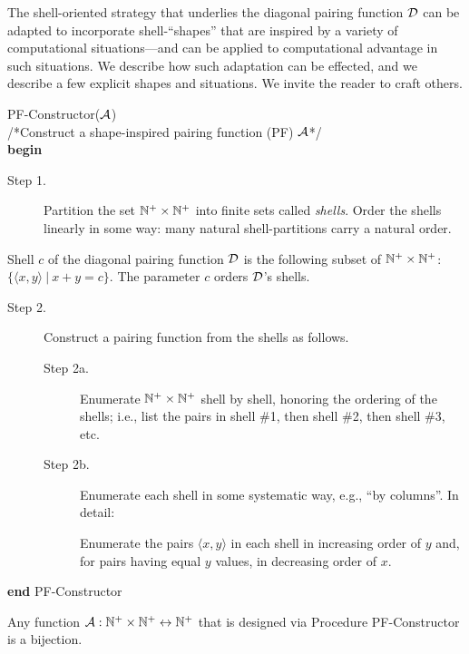 
The shell-oriented strategy that underlies the diagonal pairing function $\mbox{$\cal D$}$ can be adapted to incorporate shell-``shapes'' that are inspired by a variety of computational situations---and can be applied to computational advantage in such situations.  We describe how such adaptation can be effected, and we describe a few explicit shapes and situations.  We invite the reader to craft others.

\medskip

 {\sf PF-Constructor}($\mbox{$\cal A$}$) \\
/*Construct a shape-inspired pairing function (PF) $\mbox{$\cal A$}$*/  \\
{\bf begin}
\begin{description}
\item[Step 1.]
%
Partition the set $\mathbb{N}^+ \times \mathbb{N}^+$ into finite sets called {\it shells}.  Order the shells linearly in some way: many natural shell-partitions carry a natural order.
\end{description}
Shell $c$ of the diagonal pairing function $\mbox{$\cal D$}$ is the following subset of $\mathbb{N}^+ \times \mathbb{N}^+$: $\{ \langle x,y \rangle \ | \ x+y = c \}$.  The parameter $c$ orders $\mbox{$\cal D$}$'s shells.

\begin{description}
\item[Step 2.]
Construct a pairing function from the shells as follows.
  \begin{description}
  \item[Step 2a.]
Enumerate $\mathbb{N}^+ \times \mathbb{N}^+$ shell by shell, honoring the ordering of the shells; i.e., list the pairs in shell \#1, then shell \#2, then shell \#3, etc.
  \item[Step 2b.]
Enumerate each shell in some systematic way, e.g., ``by columns''.  In detail:

\smallskip

Enumerate the pairs $\langle x,y \rangle$ in each shell in increasing order of $y$ and, for pairs having equal $y$ values, in decreasing order of $x$.
  \end{description}
\end{description}
{\bf end} {\sf PF-Constructor}

\medskip

\begin{prop}
\label{thm:PF-construct}
Any function $\mbox{$\cal A$}: \mathbb{N}^+ \times \mathbb{N}^+ \leftrightarrow \mathbb{N}^+$ that is designed via Procedure {\small\sf PF-Constructor} is a bijection.
\end{prop}

